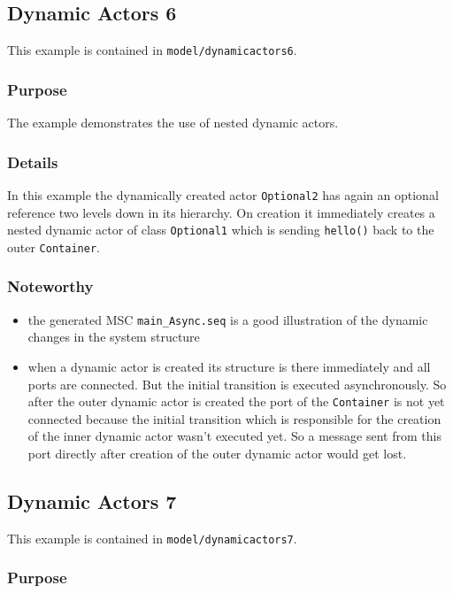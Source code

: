 \subsection{Dynamic Actors 6}

This example is contained in \texttt{model/dynamicactors6}.

\subsubsection{Purpose}

The example demonstrates the use of nested dynamic actors.

\subsubsection{Details}

In this example the dynamically created actor \texttt{Optional2} has again an optional reference two levels down in its hierarchy.
On creation it immediately creates a nested dynamic actor of class \texttt{Optional1} which is sending \texttt{hello()} back
to the outer \texttt{Container}.

\subsubsection{Noteworthy}

\begin{itemize}
\item the generated MSC \texttt{main\_Async.seq} is a good illustration of the dynamic changes in the system structure
\item when a dynamic actor is created its structure is there immediately and all ports are connected. But the initial transition
is executed asynchronously. So after the outer dynamic actor is created the port of the \texttt{Container} is not yet connected
because the initial transition which is responsible for the creation of the inner dynamic actor wasn't executed yet.
So a message sent from this port directly after creation of the outer dynamic actor would get lost.
\end{itemize}

\subsection{Dynamic Actors 7}

This example is contained in \texttt{model/dynamicactors7}.

\subsubsection{Purpose}

